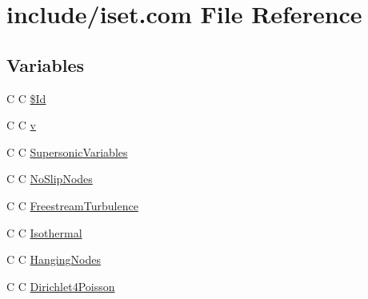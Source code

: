 \hypertarget{home_2abonfi_2_c_f_d__codes_2_eul_f_s_83_84_2include_2iset_8com}{\section{include/iset.com File Reference}
\label{home_2abonfi_2_c_f_d__codes_2_eul_f_s_83_84_2include_2iset_8com}
}
\subsection*{Variables}
\begin{DoxyCompactItemize}
\item 
C C \hyperlink{home_2abonfi_2_c_f_d__codes_2_eul_f_s_83_84_2include_2iset_8com_af40bd3a96fc1553c00422342f92046b8}{\$\-Id}
\item 
C C \hyperlink{home_2abonfi_2_c_f_d__codes_2_eul_f_s_83_84_2include_2iset_8com_a8961853e9a171af64fe80e35da93a2e0}{v}
\item 
C C \hyperlink{home_2abonfi_2_c_f_d__codes_2_eul_f_s_83_84_2include_2iset_8com_a9c554f5a269e13d0fc42881eee35b577}{Supersonic\-Variables}
\item 
C C \hyperlink{home_2abonfi_2_c_f_d__codes_2_eul_f_s_83_84_2include_2iset_8com_a3ceb88c3d1d9785f38fbf3e9cb4fdd96}{No\-Slip\-Nodes}
\item 
C C \hyperlink{home_2abonfi_2_c_f_d__codes_2_eul_f_s_83_84_2include_2iset_8com_a671b39d0fafccefc1885d7254c1336c3}{Freestream\-Turbulence}
\item 
C C \hyperlink{home_2abonfi_2_c_f_d__codes_2_eul_f_s_83_84_2include_2iset_8com_a48a8ea7f5924d8931fef20b19e99c850}{Isothermal}
\item 
C C \hyperlink{home_2abonfi_2_c_f_d__codes_2_eul_f_s_83_84_2include_2iset_8com_ab153707b02904676033ef6493c94bdee}{Hanging\-Nodes}
\item 
C C \hyperlink{home_2abonfi_2_c_f_d__codes_2_eul_f_s_83_84_2include_2iset_8com_afafa7c1b85400faa7d80cd517d4b8b11}{Dirichlet4\-Poisson}
\end{DoxyCompactItemize}


